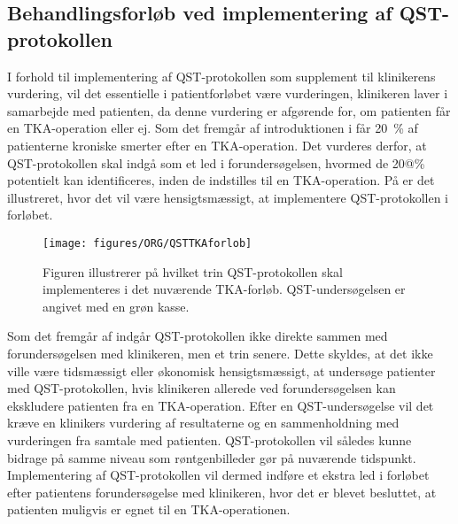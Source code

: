 \subsection{Behandlingsforløb ved implementering af QST-protokollen}
I forhold til implementering af QST-protokollen som supplement til klinikerens vurdering, vil det essentielle i patientforløbet være vurderingen, klinikeren laver i samarbejde med patienten, da denne vurdering er afgørende for, om patienten får en TKA-operation eller ej. Som det fremgår af introduktionen i  får 20~\% af patienterne kroniske smerter efter en TKA-operation. Det vurderes derfor, at QST-protokollen skal indgå som et led i forundersøgelsen, hvormed de 20@\% potentielt kan identificeres, inden de indstilles til en TKA-operation. På  er det illustreret, hvor det vil være hensigtsmæssigt, at implementere QST-protokollen i forløbet. 

\begin{figure}[H]
\begin{center}
	\texttt{[image: figures/ORG/QSTTKAforlob]}
\end{center}
	\caption{Figuren illustrerer på hvilket trin QST-protokollen skal implementeres i det nuværende TKA-forløb. QST-undersøgelsen er angivet med en grøn kasse.}
	\label{fig:QSTKAforlob}
\end{figure}\vspace{-.25cm}

Som det fremgår af  indgår QST-protokollen ikke direkte sammen med forundersøgelsen med klinikeren, men et trin senere. Dette skyldes, at det ikke ville være tidsmæssigt eller økonomisk hensigtsmæssigt, at undersøge patienter med QST-protokollen, hvis klinikeren allerede ved forundersøgelsen kan ekskludere patienten fra en TKA-operation. Efter en QST-undersøgelse vil det kræve en klinikers vurdering af resultaterne og en sammenholdning med vurderingen fra samtale med patienten. QST-protokollen vil således kunne bidrage på samme niveau som røntgenbilleder gør på nuværende tidspunkt. Implementering af QST-protokollen vil dermed indføre et ekstra led i forløbet efter patientens forundersøgelse med klinikeren, hvor det er blevet besluttet, at patienten muligvis er egnet til en TKA-operationen. 

